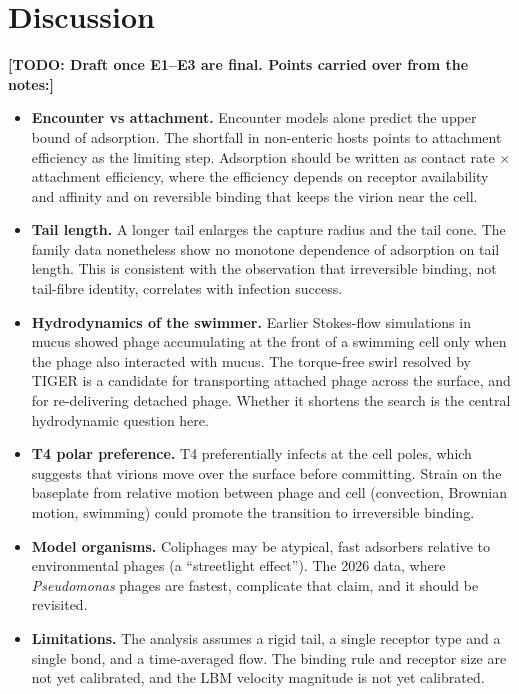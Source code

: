 \documentclass[12pt]{article}
\newcommand{\todo}[1]{{\color{blue}\textbf{[TODO: #1]}}}
\begin{document}
\section*{Discussion}
\todo{Draft once E1--E3 are final. Points carried over from the notes:}
\begin{itemize}
\item \textbf{Encounter vs attachment.} Encounter models alone predict the upper bound of adsorption. The shortfall in non-enteric hosts points to attachment efficiency as the limiting step. Adsorption should be written as contact rate $\times$ attachment efficiency, where the efficiency depends on receptor availability and affinity and on reversible binding that keeps the virion near the cell\cite{edwards2021making,schwartz1976adsorption}.
\item \textbf{Tail length.} A longer tail enlarges the capture radius and the tail cone. The family data nonetheless show no monotone dependence of adsorption on tail length. This is consistent with the observation that irreversible binding, not tail-fibre identity, correlates with infection success.
\item \textbf{Hydrodynamics of the swimmer.} Earlier Stokes-flow simulations in mucus showed phage accumulating at the front of a swimming cell only when the phage also interacted with mucus. The torque-free swirl resolved by TIGER is a candidate for transporting attached phage across the surface, and for re-delivering detached phage. Whether it shortens the search is the central hydrodynamic question here.
\item \textbf{T4 polar preference.} T4 preferentially infects at the cell poles, which suggests that virions move over the surface before committing. Strain on the baseplate from relative motion between phage and cell (convection, Brownian motion, swimming) could promote the transition to irreversible binding.
\item \textbf{Model organisms.} Coliphages may be atypical, fast adsorbers relative to environmental phages (a ``streetlight effect''). The 2026 data, where \textit{Pseudomonas} phages are fastest, complicate that claim, and it should be revisited.
\item \textbf{Limitations.} The analysis assumes a rigid tail, a single receptor type and a single bond, and a time-averaged flow. The binding rule and receptor size are not yet calibrated, and the LBM velocity magnitude is not yet calibrated.
\end{itemize}
\end{document}
